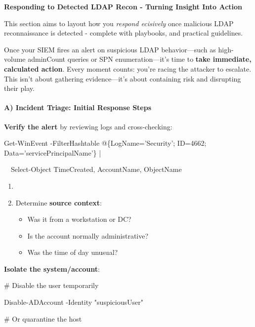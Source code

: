 {{\textbf{Responding to Detected LDAP Recon - Turning Insight Into Action}

This section aims to layout how you \textit{respond ecisively }once malicious LDAP reconnaissance is detected - complete with playbooks, and practical guidelines.

Once your SIEM fires an alert on suspicious LDAP behavior—such as high-volume adminCount queries or SPN enumeration—it’s time to \textbf{take immediate, calculated action}. Every moment counts: you’re racing the attacker to escalate. This isn’t about gathering evidence—it’s about containing risk and disrupting their play.

\paragraph{\textbf{   A) Incident Triage: Initial Response Steps}}

\textbf{Verify the alert} by reviewing logs and cross-checking:

  

 

Get-WinEvent -FilterHashtable @\{LogName='Security'; ID=4662; Data='servicePrincipalName'\} |

  Select-Object TimeCreated, AccountName, ObjectName

\begin{enumerate}
    \item 

    \item Determine \textbf{source context}:

    \begin{itemize}
        \item Was it from a workstation or DC?

        \item Is the account normally administrative?

        \item Was the time of day unusual?

    \end{itemize}
\end{enumerate}
\textbf{Isolate the system/account}:

  

 

\# Disable the user temporarily

Disable-ADAccount -Identity "suspiciousUser"

\# Or quarantine the host

}}
